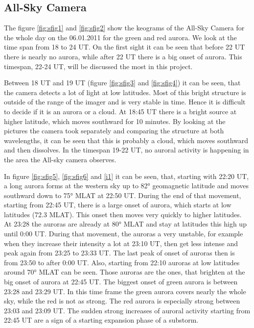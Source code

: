\documentclass[10pt,a4paper]{article}
\begin{document}
\subsection{All-Sky Camera}

The figure \ref{fig:sfig1} and \ref{fig:sfig2} show the keograms of the All-Sky Camera for the whole day on the 06.01.2011 for the green and red aurora. We look at the time span from 18 to 24 UT. On the first sight it can be seen that before 22 UT there is nearly no aurora, while after 22 UT there is a big onset of aurora. This timespan, 22-24 UT, will be discussed the most in this project.

Between 18 UT and 19 UT (figure \ref{fig:sfig3} and \ref{fig:sfig4}) it can be seen, that the camera detects a lot of light at low latitudes. Most of this bright structure is outside of the range of the imager and is very stable in time. Hence it is difficult to decide if it is an aurora or a cloud. At 18:45 UT there is a bright source at higher latitude, which moves southward for 10 minutes. By looking at the pictures the camera took separately and comparing the structure at both wavelengths, it can be seen that this is probably a cloud, which moves southward and then dissolves. 
In the timespan 19-22 UT, no auroral activity is happening in the area the All-sky camera observes.

 In figure \ref{fig:sfig5}, \ref{fig:sfig6} and \ref{i1} it can be seen, that, starting with 22:20 UT, a long aurora forms at the western sky up to 82° geomagnetic latitude and moves southward down to 75° MLAT at 22:50 UT. During the end of that movement, starting from 22:45 UT, there is a large onset of aurora, which starts at low latitudes (72.3 MLAT). This onset then moves very quickly to higher latitudes. At 23:28 the auroras are already at 80° MLAT and stay at latitudes this high up until 0:00 UT. During that movement, the auroras a very unstable, for example when they increase their intensity a lot at 23:10 UT, then get less intense and peak again from 23:25 to 23:33 UT. The last peak of onset of auroras then is from 23:50 to after 0:00 UT.
 Also, starting from 22:10 auroras at low latitudes around 70° MLAT can be seen. Those auroras are the ones, that brighten at the big onset of aurora at 22:45 UT.
The biggest onset of green aurora is between 23:28 and 23:29 UT. In this time frame the green aurora covers nearly the whole sky, while the red is not as strong. The red aurora is especially strong between 23:03 and 23:09 UT.
The sudden strong increases of auroral activity starting from 22:45 UT are a sign of a starting expansion phase of a substorm.
\end{document}

